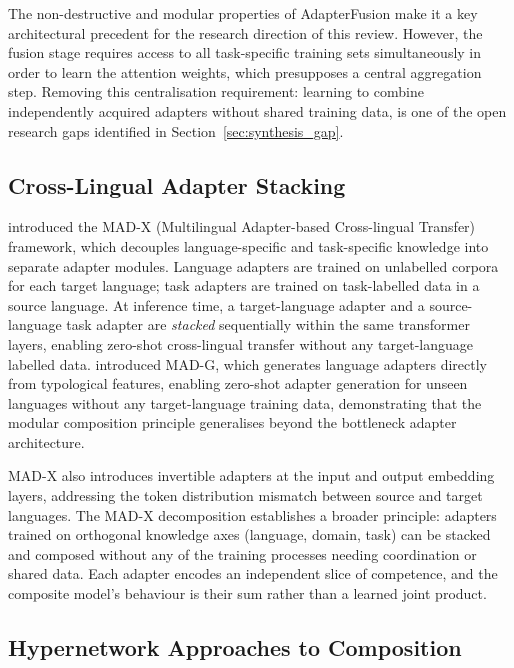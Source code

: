 The non-destructive and modular properties of AdapterFusion make it a key architectural
precedent for the research direction of this review. However, the fusion stage requires
access to all task-specific training sets simultaneously in order to learn the attention
weights, which presupposes a central aggregation step. Removing this centralisation
requirement: learning to combine independently acquired adapters without
shared training data, is one of the open research gaps identified in Section~\ref{sec:synthesis_gap}.

\subsection{Cross-Lingual Adapter Stacking}
\label{sec:adapter_composition:madx}

\citet{PfeifferMADX2020} introduced the MAD-X (Multilingual Adapter-based Cross-lingual
Transfer) framework, which decouples language-specific and task-specific knowledge into
separate adapter modules. Language adapters are trained on unlabelled corpora for each
target language; task adapters are trained on task-labelled data in a source language.
At inference time, a target-language adapter and a source-language task adapter are
\textit{stacked} sequentially within the same transformer layers, enabling zero-shot
cross-lingual transfer without any target-language labelled data. \citet{AnsellMADG2021} introduced MAD-G, which generates language adapters directly
from typological features, enabling zero-shot adapter generation for unseen languages
without any target-language training data, demonstrating that the modular composition principle generalises beyond the bottleneck
adapter architecture.

MAD-X also introduces invertible adapters at the input and output embedding layers,
addressing the token distribution mismatch between source and target languages.
The MAD-X decomposition establishes a broader principle: adapters trained on orthogonal
knowledge axes (language, domain, task) can be stacked and composed without any of the
training processes needing coordination or shared data. Each adapter encodes an independent
slice of competence, and the composite model's behaviour is their sum rather than a
learned joint product.

\subsection{Hypernetwork Approaches to Composition}
\label{sec:adapter_composition:hyper}

